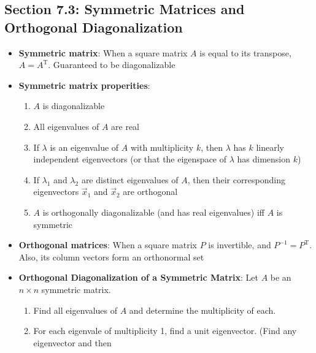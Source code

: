 \documentclass[15pt]{article}
\begin{document}
\begin{flushleft}
\section{\textbf{Section 7.3}: Symmetric Matrices and Orthogonal Diagonalization}
\begin{itemize}
        \item \textbf{Symmetric matrix}: When a square matrix $A$ is equal to its
                transpose, $A = A^\text{T}$. Guaranteed to be diagonalizable
        \item \textbf{Symmetric matrix properities}:
                \begin{enumerate}
                        \item $A$ is diagonalizable
                        \item All eigenvalues of $A$ are real
                        \item If $\lambda$ is an eigenvalue of $A$ with 
                                multiplicity $k$, then $\lambda$ has $k$ 
                                linearly independent eigenvectors (or that the
                                eigenspace of $\lambda$ has dimension $k$)
                        \item If $\lambda_1$ and $\lambda_2$ are distinct
                                eigenvalues of $A$, then their corresponding
                                eigenvectors $\vec{x}_1$ and $\vec{x}_2$ are
                                orthogonal
                        \item $A$ is orthogonally diagonalizable (and has real
                                eigenvalues) iff $A$ is symmetric
                \end{enumerate}
        \item \textbf{Orthogonal matrices}: When a square matrix $P$ is 
                invertible, and $P^{-1} = P^\text{T}$. Also, its column vectors 
                form an orthonormal set
        \item \textbf{Orthogonal Diagonalization of a Symmetric Matrix}: Let $A$
                be an $n \times n$ symmetric matrix.
                \begin{enumerate}
                        \item Find all eigenvalues of $A$ and determine the
                                multiplicity of each.
                        \item For each eigenvale of multiplicity 1, find a unit
                                eigenvector. (Find any eigenvector and then

\end{enumerate}
\end{itemize}
\end{flushleft}
\end{document}
